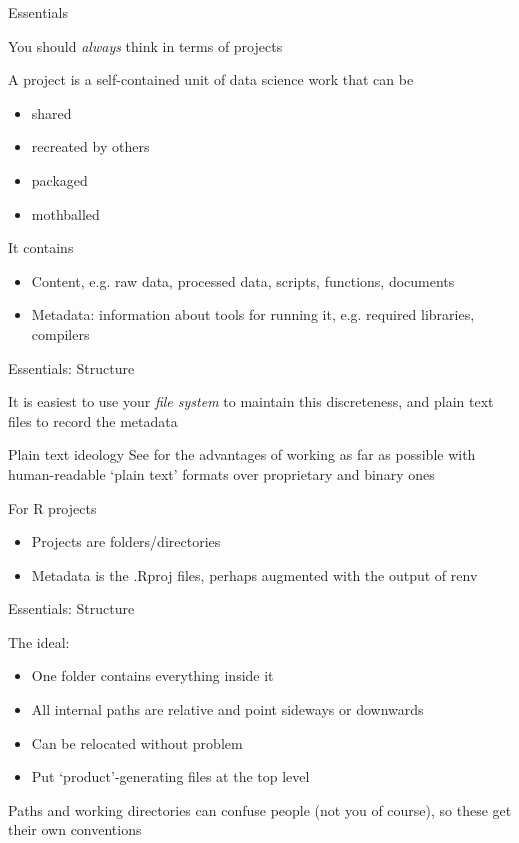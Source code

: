 \documentclass{hertieteaching}
\begin{document}
\begin{frame}{Essentials}

You should \textit{always} think in terms of projects
  
A project is a self-contained unit of data science work that can be 
\begin{itemize}
  \item shared
  \item recreated by others
  \item packaged
  \item mothballed
\end{itemize}
It contains
\begin{itemize}
  \item Content, e.g. raw data, processed data, scripts, functions, documents
  \item Metadata: information about tools for running it, e.g. required libraries, compilers  
\end{itemize}

\end{frame}
\begin{frame}{Essentials: Structure}

It is easiest to use your \textit{file system} to maintain this discreteness, and plain text files to record the metadata

\begin{block}{Plain text ideology}
See \textcite{Healy2019} for the advantages of working as far as possible with human-readable `plain text' formats over proprietary and binary ones
\end{block}  

For R projects
\begin{itemize}
  \item Projects are folders/directories
  \item Metadata is the \textsf{.Rproj} files, perhaps augmented with the output of \textsf{renv}
\end{itemize}



\end{frame}
\begin{frame}{Essentials: Structure}

The ideal:  
\begin{itemize}
  \item One folder contains everything inside it
  \item All internal paths are relative and point sideways or downwards
  \item Can be relocated without problem
  \item Put `product'-generating files at the top level
\end{itemize}

Paths and working directories can confuse people (not you of course), so these get their own conventions

\end{frame}
\end{document}
